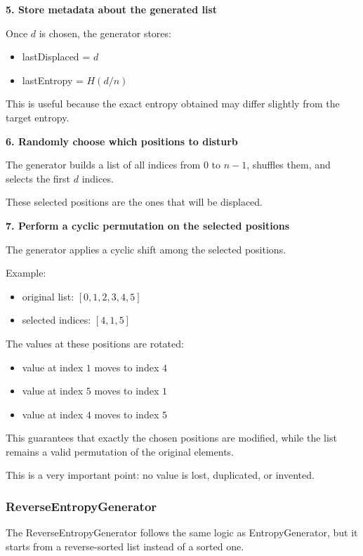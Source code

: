\documentclass{article}
\begin{document}
\textbf{5. Store metadata about the generated list}

Once $d$ is chosen, the generator stores:
\begin{itemize}
    \item lastDisplaced = $d$
    \item lastEntropy = $H(d/n)$
\end{itemize}

This is useful because the exact entropy obtained may differ slightly from the target entropy.

\textbf{6. Randomly choose which positions to disturb}

The generator builds a list of all indices from $0$ to $n-1$, shuffles them, and selects the first $d$ indices.

These selected positions are the ones that will be displaced.

\textbf{7. Perform a cyclic permutation on the selected positions}

The generator applies a cyclic shift among the selected positions.

Example:
\begin{itemize}
    \item original list: $[0,1,2,3,4,5]$
    \item selected indices: $[4,1,5]$
\end{itemize}

The values at these positions are rotated:
\begin{itemize}
    \item value at index $1$ moves to index $4$
    \item value at index $5$ moves to index $1$
    \item value at index $4$ moves to index $5$
\end{itemize}

This guarantees that exactly the chosen positions are modified, while the list remains a valid permutation of the original elements.

This is a very important point: no value is lost, duplicated, or invented.


\subsubsection{ReverseEntropyGenerator}

The ReverseEntropyGenerator follows the same logic as EntropyGenerator, but it starts from a reverse-sorted list instead of a sorted one.
\end{document}
